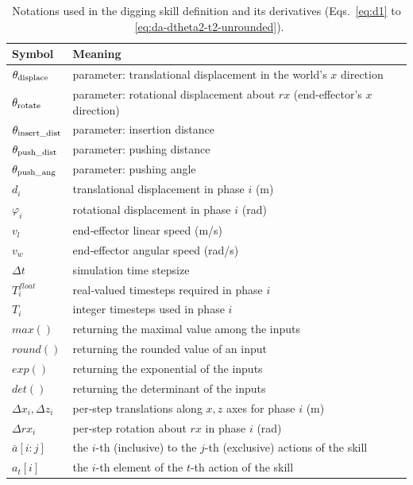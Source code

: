 \documentclass[letterpaper, 10 pt, journal, twoside]{ieeetran}
\begin{document}
\begin{table}[h]
\small
\centering
\begin{tabular}{lE}
\toprule
\textbf{Symbol} & \textbf{Meaning} \\
\midrule
$\theta_{\rm displace}$       & parameter: translational displacement in the world's $x$ direction \\
$\theta_{\rm rotate}$         & parameter: rotational displacement about $rx$ (end-effector's $x$ direction) \\
$\theta_{\rm insert\_dist}$   & parameter: insertion distance \\
$\theta_{\rm push\_dist}$     & parameter: pushing distance \\
$\theta_{\rm push\_ang}$      & parameter: pushing angle \\
$d_i$                         & translational displacement in phase $i$ (m) \\
$\varphi_i$                   & rotational displacement in phase $i$ (rad) \\
$v_l$                         & end‐effector linear speed (m/s) \\
$v_w$                         & end‐effector angular speed (rad/s) \\
$\Delta t$                    & simulation time stepsize\\
$T^{float}_i$                 & real‐valued timesteps required in phase $i$\\
$T_{i}$                       & integer timesteps used in phase $i$ \\
$max()$                       & returning the maximal value among the inputs\\
$round()$                     & returning the rounded value of an input\\
$exp()$                       & returning the exponential of the inputs\\
$det()$                       & returning the determinant of the inputs\\
$\Delta x_i,\Delta z_i$       & per‐step translations along $x,z$ axes for phase $i$ (m) \\
$\Delta rx_i$                 & per‐step rotation about $rx$ in phase $i$ (rad) \\
$\bar{a}[i:j]$                & the $i$-th (inclusive) to the $j$-th (exclusive) actions of the skill\\
$a_t[i]$                      & the $i$-th element of the $t$-th action of the skill\\
\bottomrule
\end{tabular}
\caption{Notations used in the digging skill definition and its derivatives (Eqs.~\ref{eq:d1} to ~\ref{eq:da-dtheta2-t2-unrounded}).}\label{tab:skill-notation}
\end{table}
\end{document}
